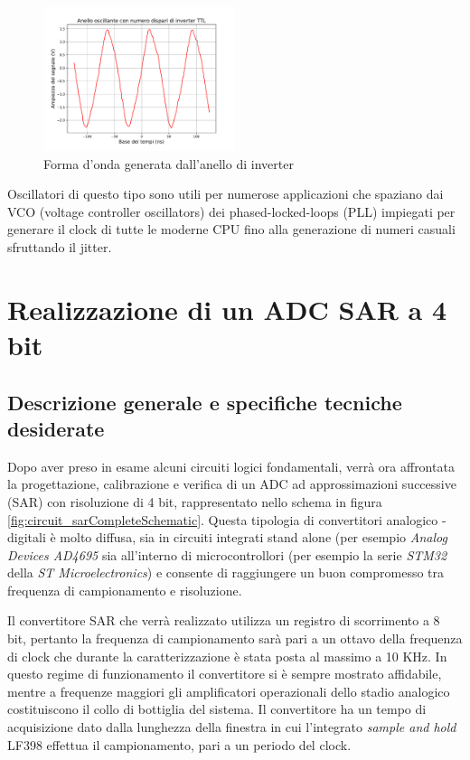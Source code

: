 \documentclass[journal]{IEEEtran}
\begin{document}
\begin{figure}[H]%
\begin{center}
\includegraphics[width=0.50\textwidth]{analysis/output/oscillating-ring.pdf}
\caption{Forma d'onda generata dall'anello di inverter}
\label{fig:graph_ring_oscillator}
\end{center}
\end{figure}


Oscillatori di questo tipo sono utili per numerose applicazioni che spaziano dai VCO (voltage controller oscillators) dei phased-locked-loops (PLL) impiegati per generare il clock di tutte le moderne CPU fino alla generazione di numeri casuali sfruttando il jitter.


\section{Realizzazione di un ADC SAR a 4 bit}

\subsection{Descrizione generale e specifiche tecniche desiderate}
Dopo aver preso in esame alcuni circuiti logici fondamentali, verrà ora affrontata la progettazione, calibrazione e verifica di un ADC ad approssimazioni successive (SAR) con risoluzione di 4 bit, rappresentato nello schema in figura \ref{fig:circuit_sarCompleteSchematic}. Questa tipologia di convertitori analogico - digitali è molto diffusa, sia in circuiti integrati stand alone (per esempio \textit{Analog Devices AD4695} sia all'interno di microcontrollori (per esempio la serie \textit{STM32} della \textit{ST Microelectronics}) e consente di raggiungere un buon compromesso tra frequenza di campionamento e risoluzione.

Il convertitore SAR che verrà realizzato utilizza un registro di scorrimento a 8 bit, pertanto la frequenza di campionamento sarà pari a un ottavo della frequenza di clock che durante la caratterizzazione è stata posta al massimo a 10 KHz. In questo regime di funzionamento il convertitore si è sempre mostrato affidabile, mentre a frequenze maggiori gli amplificatori operazionali dello stadio analogico costituiscono il collo di bottiglia del sistema. Il convertitore ha un tempo di acquisizione dato dalla lunghezza della finestra in cui l'integrato \textit{sample and hold} LF398 effettua il campionamento, pari a un periodo del clock.
\end{document}

